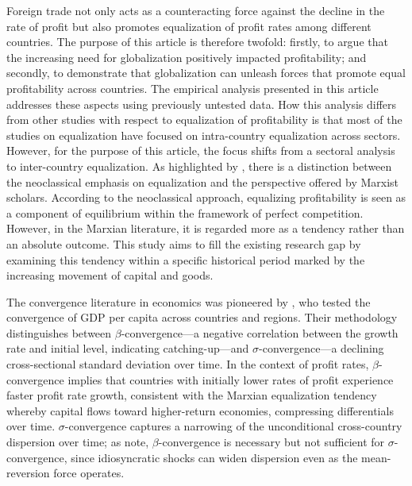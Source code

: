 \documentclass[10pt]{article}
\begin{document}
\par Foreign trade not only acts as a counteracting force against the decline in the rate of profit but also promotes equalization of profit rates among different countries. The purpose of this article is therefore twofold: firstly, to argue that the increasing need for globalization positively impacted profitability; and secondly, to demonstrate that globalization can unleash forces that promote equal profitability across countries. The empirical analysis presented in this article addresses these aspects using previously untested data. How this analysis differs from other studies with respect to equalization of profitability is that most of the studies on equalization have focused on intra-country equalization across sectors. However, for the purpose of this article, the focus shifts from a sectoral analysis to inter-country equalization. As highlighted by \citet{ChouIzyumovVahaly2015}, there is a distinction between the neoclassical emphasis on equalization and the perspective offered by Marxist scholars. According to the neoclassical approach, equalizing profitability is seen as a component of equilibrium within the framework of perfect competition. However, in the Marxian literature, it is regarded more as a tendency rather than an absolute outcome. This study aims to fill the existing research gap by examining this tendency within a specific historical period marked by the increasing movement of capital and goods.

\par The convergence literature in economics was pioneered by \citet{BarroSalaIMartin1997}, who tested the convergence of GDP per capita across countries and regions. Their methodology distinguishes between $\beta$-convergence---a negative correlation between the growth rate and initial level, indicating catching-up---and $\sigma$-convergence---a declining cross-sectional standard deviation over time. In the context of profit rates, $\beta$-convergence implies that countries with initially lower rates of profit experience faster profit rate growth, consistent with the Marxian equalization tendency whereby capital flows toward higher-return economies, compressing differentials over time. $\sigma$-convergence captures a narrowing of the unconditional cross-country dispersion over time; as \citet{BarroSalaIMartin1997} note, $\beta$-convergence is necessary but not sufficient for $\sigma$-convergence, since idiosyncratic shocks can widen dispersion even as the mean-reversion force operates.
\end{document}
